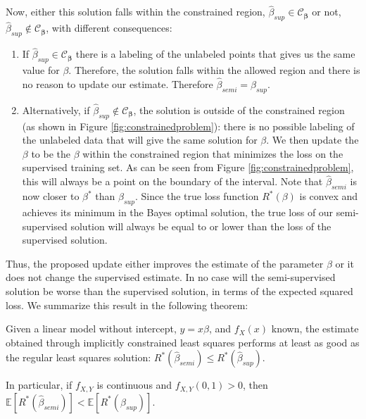\documentclass[smallcondensed]{svjour3}
\begin{document}
Now, either this solution falls within the constrained region, $\hat{\beta}_{sup} \in \mathcal{C}_{\boldsymbol{\beta}}$ or not, $\hat{\beta}_{sup} \notin \mathcal{C}_{\boldsymbol{\beta}}$, with different consequences:

\begin{enumerate}
  \item If $\hat{\beta}_{sup} \in \mathcal{C}_{\boldsymbol{\beta}}$ there is a labeling of the unlabeled points that gives us the same value for $\beta$. Therefore, the solution falls within the allowed region and there is no reason to update our estimate. Therefore $\hat{\beta}_{semi}=\beta_{sup}$.
  \item Alternatively, if $\hat{\beta}_{sup} \notin  \mathcal{C}_{\boldsymbol{\beta}}$, the solution is outside of the constrained region (as shown in Figure \ref{fig:constrainedproblem}): there is no possible labeling of the unlabeled data that will give the same solution for $\beta$. We then update the $\beta$ to be the $\beta$ within the constrained region that minimizes the loss on the supervised training set. As can be seen from Figure \ref{fig:constrainedproblem}, this will always be a point on the boundary of the interval. Note that $\hat{\beta}_{semi}$ is now closer to $\beta^{*}$ than $\hat{\beta}_{sup}$. Since the true loss function $R^*(\beta)$ is convex  and achieves its minimum in the Bayes optimal solution, the true loss of our semi-supervised solution will always be equal to or lower than the loss of the supervised solution.
\end{enumerate}

Thus, the proposed update either improves the estimate of the parameter $\beta$ or it does not change the supervised estimate. In no case will the semi-supervised solution be worse than the supervised solution, in terms of the expected squared loss. We summarize this result in the following theorem:

\begin{theorem} \mbox{}
Given a linear model without intercept, $y = x\beta$, and $f_X(x)$ known, the estimate obtained through implicitly constrained least squares performs at least as good as the regular least squares solution: $R^\ast (\hat{\beta}_{semi}) \le R^\ast (\hat{\beta}_{sup})$.

In particular, if $f_{X,Y}$ is continuous and $f_{X,Y}(0,1) > 0$, then \\ $\mathbb{E}[R^*(\hat{\beta}_{semi})] < \mathbb{E}[R^*(\hat{\beta}_{sup})]$.
\end{theorem}
\end{document}

